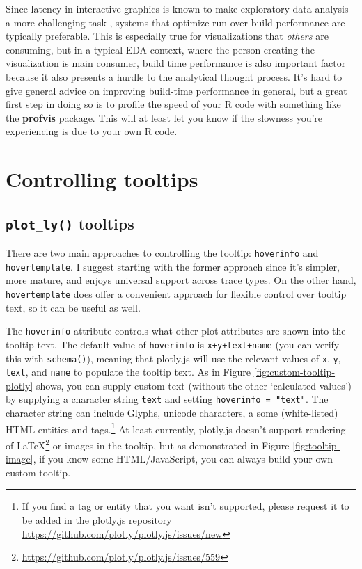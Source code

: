 \documentclass[
  12pt,
]{krantz}
\renewcommand{\href}[2]{#2\footnote{\url{#1}}}
\begin{document}
Since latency in interactive graphics is known to make exploratory data analysis a more challenging task \citep{2014-latency}, systems that optimize run over build performance are typically preferable. This is especially true for visualizations that \emph{others} are consuming, but in a typical EDA context, where the person creating the visualization is main consumer, build time performance is also important factor because it also presents a hurdle to the analytical thought process. It's hard to give general advice on improving build-time performance in general, but a great first step in doing so is to profile the speed of your R code with something like the \textbf{profvis} package. This will at least let you know if the slowness you're experiencing is due to your own R code.

\hypertarget{controlling-tooltips}{%
\chapter{Controlling tooltips}\label{controlling-tooltips}}

\hypertarget{tooltip-text}{%
\section{\texorpdfstring{\texttt{plot\_ly()} tooltips}{plot\_ly() tooltips}}\label{tooltip-text}}

There are two main approaches to controlling the tooltip: \texttt{hoverinfo} and \texttt{hovertemplate}. I suggest starting with the former approach since it's simpler, more mature, and enjoys universal support across trace types. On the other hand, \texttt{hovertemplate} does offer a convenient approach for flexible control over tooltip text, so it can be useful as well.

The \texttt{hoverinfo} attribute controls what other plot attributes are shown into the tooltip text. The default value of \texttt{hoverinfo} is \texttt{x+y+text+name} (you can verify this with \texttt{schema()}), meaning that plotly.js will use the relevant values of \texttt{x}, \texttt{y}, \texttt{text}, and \texttt{name} to populate the tooltip text. As in Figure \ref{fig:custom-tooltip-plotly} shows, you can supply custom text (without the other `calculated values') by supplying a character string \texttt{text} and setting \texttt{hoverinfo\ =\ "text"}. The character string can include Glyphs, unicode characters, a some (white-listed) HTML entities and tags.\footnote{If you find a tag or entity that you want isn't supported, please request it to be added in the plotly.js repository \url{https://github.com/plotly/plotly.js/issues/new}} At least currently, plotly.js doesn't support rendering of \href{https://github.com/plotly/plotly.js/issues/559}{LaTeX} or images in the tooltip, but as demonstrated in Figure \ref{fig:tooltip-image}, if you know some HTML/JavaScript, you can always build your own custom tooltip.
\end{document}
